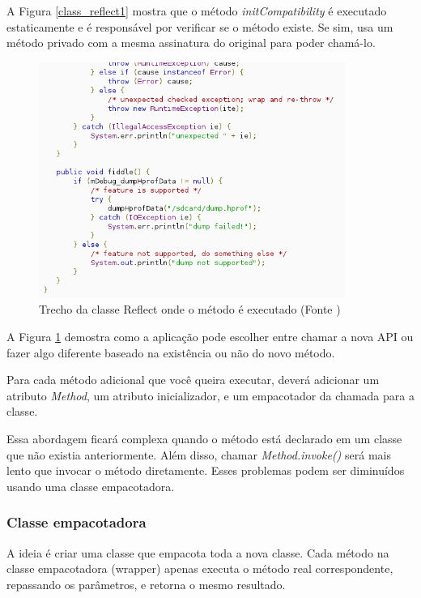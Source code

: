 A Figura \ref{class_reflect1} mostra que o método {\it initCompatibility} é executado
 estaticamente e é responsável por verificar se o método existe. Se sim, usa um método 
 privado com a mesma assinatura do original para poder chamá-lo. 

\begin{figure}[h]
    \centering
    \includegraphics[width=10cm]{img/reflect2}
    \caption[Trecho da classe Reflect onde o método é executado]{Trecho da classe Reflect onde o método é executado (Fonte \cite{back_compat})}
    \label{class_reflect2}
\end{figure}

A Figura \ref{class_reflect2} demostra como a aplicação pode escolher entre chamar 
a nova API ou fazer algo diferente baseado na existência ou não do novo método.

Para cada método adicional que você queira executar, deverá adicionar um atributo 
{\it Method}, um atributo inicializador, e um empacotador da chamada para a classe.

Essa abordagem ficará complexa quando o método está declarado em um classe que não 
existia anteriormente. Além disso, chamar {\it Method.invoke()} será mais lento 
que invocar o método diretamente. Esses problemas podem ser diminuídos usando uma
classe empacotadora.

\subsubsection{Classe empacotadora}

A ideia é criar uma classe que empacota toda a nova classe. Cada método na classe 
empacotadora (wrapper) apenas executa o método real correspondente, repassando os 
parâmetros, e retorna o mesmo resultado.

